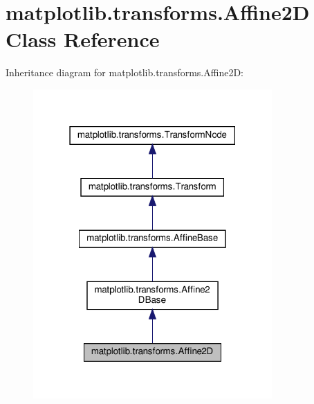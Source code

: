 \hypertarget{classmatplotlib_1_1transforms_1_1Affine2D}{}\section{matplotlib.\+transforms.\+Affine2D Class Reference}
\label{classmatplotlib_1_1transforms_1_1Affine2D}


Inheritance diagram for matplotlib.\+transforms.\+Affine2D\+:
\nopagebreak
\begin{figure}[H]
\begin{center}
\leavevmode
\includegraphics[width=259pt]{classmatplotlib_1_1transforms_1_1Affine2D__inherit__graph}
\end{center}
\end{figure}


